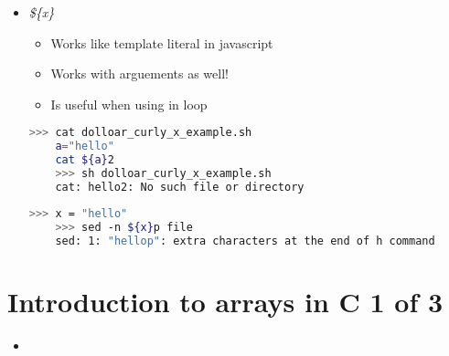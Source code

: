 \documentclass[12pt]{article}
\begin{document}
\begin{itemize}
    \item \textit{\$\{x\}}
    \begin{itemize}
    \item Works like template literal in javascript
    \item Works with arguements as well!
    \item Is useful when using in loop
    \end{itemize}

    \begin{lstlisting}[language=bash]
    >>> cat dolloar_curly_x_example.sh
    a="hello"
    cat ${a}2
    >>> sh dolloar_curly_x_example.sh
    cat: hello2: No such file or directory
    \end{lstlisting}
    \begin{lstlisting}[language=bash]
    >>> x = "hello"
    >>> sed -n ${x}p file
    sed: 1: "hellop": extra characters at the end of h command
    \end{lstlisting}
\end{itemize}

\bigskip

\section*{Introduction to arrays in C 1 of 3}

\bigskip

\begin{itemize}
    \item
\end{itemize}
\end{document}
